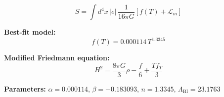
\begin{equation}
  S = \int d^4x \, |e| \, \frac{1}{16\pi G} \left[ f(T) + \mathcal{L}_m \right]
\end{equation}

\textbf{Best-fit model:}
\begin{equation}
  f(T) = 0.000114 \, T^{1.3345}
\end{equation}

\textbf{Modified Friedmann equation:}
\begin{equation}
  H^2 = \frac{8\pi G}{3} \rho - \frac{f}{6} + \frac{T f_T}{3}
\end{equation}

\textbf{Parameters:}
$\alpha = 0.000114$, \quad
$\beta = -0.183093$, \quad
$n = 1.3345$, \quad
$\Lambda_{\text{BI}} = 23.1763$